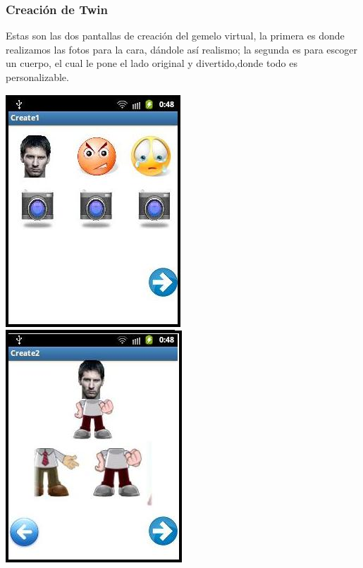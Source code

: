 \documentclass[12pt]{article}
\begin{document}
{{{\begin{flushleft}
\subsubsection{Creaci\'on de Twin}
\vspace{0.1in}
Estas son las dos pantallas de creaci\'on del gemelo virtual, la primera es donde realizamos las fotos para la cara, d\'andole as\'i realismo; la segunda es para escoger un cuerpo, el cual le pone el lado original y divertido,donde todo es personalizable. \\
\begin{center}
\vspace{0.5in}
\includegraphics[scale=1.0]{imagenes_android/create1.jpg}
\hspace{0.1in}\includegraphics[scale=1.0]{imagenes_android/create2.jpg}
\end{center}


\newpage

\end{flushleft}}}}
\end{document}
